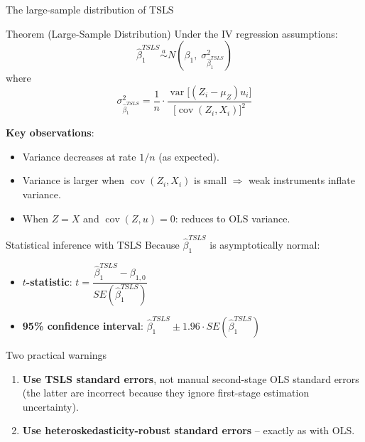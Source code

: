 \documentclass[10pt]{beamer}
\begin{document}
\begin{frame}{The large-sample distribution of TSLS}
\label{slide:large_sample}

\begin{block}{Theorem (Large-Sample Distribution)}
Under the IV regression assumptions:
\[
\widehat{\beta}_1^{TSLS} \stackrel{a}{\sim} N\!\left(\beta_1, \;\sigma_{\widehat{\beta}_1^{TSLS}}^2\right)
\]
where
\[
\sigma_{\widehat{\beta}_1^{TSLS}}^2 = \frac{1}{n}\cdot\frac{\operatorname{var}\!\big[(Z_i - \mu_Z)u_i\big]}{\big[\operatorname{cov}(Z_i, X_i)\big]^2} \tag{12.8}
\]
\end{block}

\pause
\textbf{Key observations}:
\begin{itemize}
  \item Variance decreases at rate $1/n$ (as expected).
  \item Variance is \alert{larger} when $\operatorname{cov}(Z_i,X_i)$ is small $\Rightarrow$ weak instruments inflate variance.
  \item When $Z = X$ and $\operatorname{cov}(Z,u)=0$: reduces to OLS variance.
\end{itemize}
\end{frame}

\begin{frame}{Statistical inference with TSLS}
\label{slide:inference}
Because $\widehat{\beta}_1^{TSLS}$ is asymptotically normal:

\begin{itemize}
  \item \textbf{$t$-statistic}: $t = \dfrac{\widehat{\beta}_1^{TSLS} - \beta_{1,0}}{SE(\widehat{\beta}_1^{TSLS})}$

  \medskip
  \item \textbf{95\% confidence interval}: $\widehat{\beta}_1^{TSLS} \pm 1.96 \cdot SE(\widehat{\beta}_1^{TSLS})$
\end{itemize}

\pause
\vspace{0.5em}
\begin{alertblock}{Two practical warnings}
\begin{enumerate}
  \item \textbf{Use TSLS standard errors}, not manual second-stage OLS standard errors (the latter are incorrect because they ignore first-stage estimation uncertainty).
  \item \textbf{Use heteroskedasticity-robust standard errors} -- exactly as with OLS.
\end{enumerate}
\end{alertblock}
\end{frame}
\end{document}

